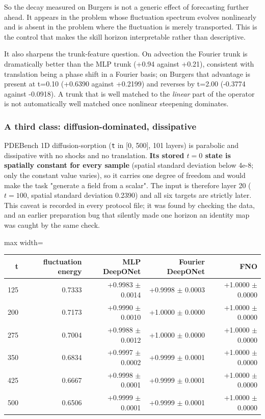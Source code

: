 \documentclass[preprint,12pt]{elsarticle}
\begin{document}
So the decay measured on Burgers is not a generic effect of forecasting further ahead. It appears in the problem whose fluctuation spectrum evolves nonlinearly and is absent in the problem where the fluctuation is merely transported. This is the control that makes the skill horizon interpretable rather than descriptive.

It also sharpens the trunk-feature question. On advection the Fourier trunk is dramatically better than the MLP trunk (+0.94 against +0.21), consistent with translation being a phase shift in a Fourier basis; on Burgers that advantage is present at t=0.10 (+0.6390 against +0.2199) and reverses by t=2.00 (-0.3774 against -0.0918). A trunk that is well matched to the \emph{linear} part of the operator is not automatically well matched once nonlinear steepening dominates.

\subsubsection{A third class: diffusion-dominated, dissipative}

PDEBench 1D diffusion-sorption (\texttt{t} in [0, 500], 101 layers) is parabolic and dissipative with no shocks and no translation. \textbf{Its stored $t = 0$ state is spatially constant for every sample} (spatial standard deviation below 4e-8; only the constant value varies), so it carries one degree of freedom and would make the task "generate a field from a scalar". The input is therefore layer 20 ($t = 100$, spatial standard deviation 0.2390) and all six targets are strictly later. This caveat is recorded in every protocol file; it was found by checking the data, and an earlier preparation bug that silently made one horizon an identity map was caught by the same check.

\begin{center}
\begin{adjustbox}{max width=\linewidth}
\small
\begin{tabular}{rrrrr}
\toprule
t & fluctuation energy & MLP DeepONet & Fourier DeepONet & FNO \\
\midrule
125 & 0.7333 & +0.9983 $\pm$ 0.0014 & +0.9998 $\pm$ 0.0003 & +1.0000 $\pm$ 0.0000 \\
200 & 0.7173 & +0.9990 $\pm$ 0.0010 & +1.0000 $\pm$ 0.0000 & +1.0000 $\pm$ 0.0000 \\
275 & 0.7004 & +0.9988 $\pm$ 0.0012 & +1.0000 $\pm$ 0.0000 & +1.0000 $\pm$ 0.0000 \\
350 & 0.6834 & +0.9997 $\pm$ 0.0002 & +0.9999 $\pm$ 0.0001 & +1.0000 $\pm$ 0.0000 \\
425 & 0.6667 & +0.9998 $\pm$ 0.0001 & +0.9999 $\pm$ 0.0001 & +1.0000 $\pm$ 0.0000 \\
500 & 0.6506 & +0.9999 $\pm$ 0.0001 & +0.9999 $\pm$ 0.0001 & +1.0000 $\pm$ 0.0000 \\
\bottomrule
\end{tabular}
\end{adjustbox}
\end{center}
\end{document}

